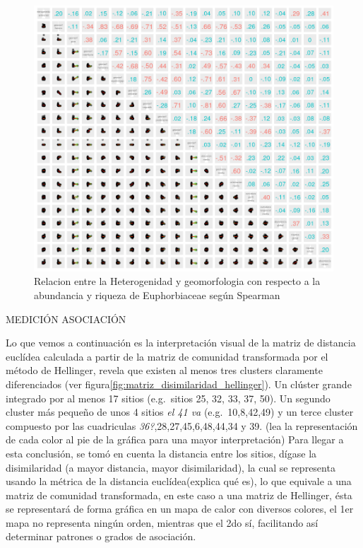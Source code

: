 \documentclass[11pt,]{article}
\begin{document}
\begin{figure}
\centering
\includegraphics{spearman.png}
\caption{\label{fig:spearman}Relacion entre la Heterogenidad y
geomorfologia con respecto a la abundancia y riqueza de Euphorbiaceae
según Spearman}
\end{figure}

MEDICIÓN ASOCIACIÓN

Lo que vemos a continuación es la interpretación visual de la matriz de
distancia euclídea calculada a partir de la matriz de comunidad
transformada por el método de Hellinger, revela que existen al menos
tres clusters claramente diferenciados (ver
figura\ref{fig:matriz_disimilaridad_hellinger}). Un clúster grande
integrado por al menos 17 sitios (e.g.~sitios 25, 32, 33, 37, 50). Un
segundo cluster más pequeño de unos 4 sitios \emph{el 41 va}
(e.g.~10,8,42,49) y un terce cluster compuesto por las cuadriculas
\emph{36?},28,27,45,6,48,44,34 y 39. (lea la representación de cada
color al pie de la gráfica para una mayor interpretación) Para llegar a
esta conclusión, se tomó en cuenta la distancia entre los sitios, dígase
la disimilaridad (a mayor distancia, mayor disimilaridad), la cual se
representa usando la métrica de la distancia euclídea(explica qué es),
lo que equivale a una matriz de comunidad transformada, en este caso a
una matriz de Hellinger, ésta se representará de forma gráfica en un
mapa de calor con diversos colores, el 1er mapa no representa ningún
orden, mientras que el 2do sí, facilitando así determinar patrones o
grados de asociación.
\end{document}

